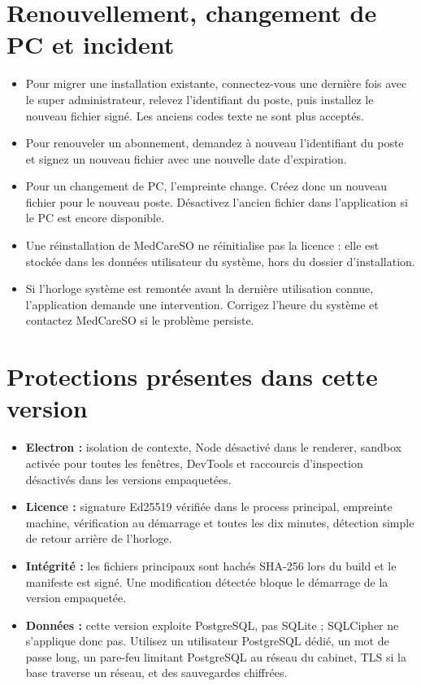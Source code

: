 \documentclass[11pt,a4paper]{article}
\begin{document}
\section{Renouvellement, changement de PC et incident}
\begin{itemize}
  \item Pour migrer une installation existante, connectez-vous une dernière fois
  avec le super administrateur, relevez l'identifiant du poste, puis installez
  le nouveau fichier signé. Les anciens codes texte ne sont plus acceptés.
  \item Pour renouveler un abonnement, demandez à nouveau l'identifiant du
  poste et signez un nouveau fichier avec une nouvelle date d'expiration.
  \item Pour un changement de PC, l'empreinte change. Créez donc un nouveau
  fichier pour le nouveau poste. Désactivez l'ancien fichier dans l'application
  si le PC est encore disponible.
  \item Une réinstallation de MedCareSO ne réinitialise pas la licence : elle
  est stockée dans les données utilisateur du système, hors du dossier
  d'installation.
  \item Si l'horloge système est remontée avant la dernière utilisation connue,
  l'application demande une intervention. Corrigez l'heure du système et
  contactez MedCareSO si le problème persiste.
\end{itemize}

\section{Protections présentes dans cette version}
\begin{itemize}
  \item \textbf{Electron :} isolation de contexte, Node désactivé dans le
  renderer, sandbox activée pour toutes les fenêtres, DevTools et raccourcis
  d'inspection désactivés dans les versions empaquetées.
  \item \textbf{Licence :} signature Ed25519 vérifiée dans le process principal,
  empreinte machine, vérification au démarrage et toutes les dix minutes,
  détection simple de retour arrière de l'horloge.
  \item \textbf{Intégrité :} les fichiers principaux sont hachés SHA-256 lors du
  build et le manifeste est signé. Une modification détectée bloque le
  démarrage de la version empaquetée.
  \item \textbf{Données :} cette version exploite PostgreSQL, pas SQLite ;
  SQLCipher ne s'applique donc pas. Utilisez un utilisateur PostgreSQL dédié,
  un mot de passe long, un pare-feu limitant PostgreSQL au réseau du cabinet,
  TLS si la base traverse un réseau, et des sauvegardes chiffrées.
\end{itemize}
\end{document}
